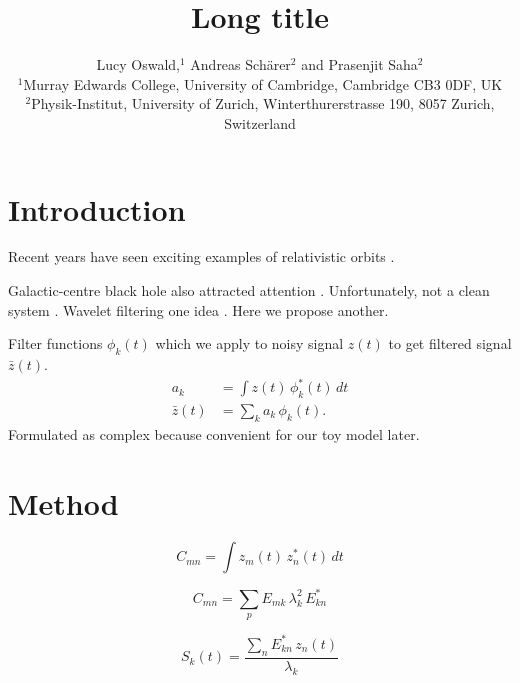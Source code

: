 \documentclass[usenatbib]{mnras}
\title[Short title]{Long title}
\author[Oswald et al]{Lucy Oswald,$^1$
Andreas Sch\"arer$^2$ and Prasenjit Saha$^2$\\
%
$^1$Murray Edwards College, University of Cambridge, Cambridge CB3 0DF, UK\\
$^2$Physik-Institut, University of Zurich, Winterthurerstrasse 190, 8057 Zurich, Switzerland\\
}
\begin{document}
\label{firstpage}
\pagerange{\pageref{firstpage}--\pageref{lastpage}}
\maketitle

\begin{abstract}
\end{abstract}

\begin{keywords}
\end{keywords}

\section{Introduction}

Recent years have seen exciting examples of relativistic
orbits \citep{2006Sci...314...97K,2006NewA...11..527C,2011PhRvL.106v1101E}.

Galactic-centre black hole also attracted attention
\citep{2008ApJ...674L..25W,2010ApJ...711..157A,2010ApJ...720.1303A,2015ApJ...809..127Z}.
Unfortunately, not a clean system \citep[cf.][]{1947RvMP...19..361C}.
Wavelet filtering one idea \citep{2014MNRAS.444.3780A}.  Here we
propose another.

Filter functions $\phi_k(t)$ which we apply to noisy signal $z(t)$ to
get filtered signal $\bar z(t)$.
\begin{equation}
\begin{aligned}
        a_k &= \int\! z(t)\,\phi_k^*(t)\,dt \\
  \bar z(t) &= \sum_k a_k \, \phi_k(t) .
\end{aligned}
\end{equation}
Formulated as complex because convenient for our toy model later.

\section{Method}

\citep{chatterjee2000introduction}

\begin{equation}
C_{mn} = \int\! z_m(t)\,z_n^*(t)\,dt
\end{equation}

\begin{equation}
C_{mn} = \sum_p E_{mk} \, \lambda_k^2 \, E_{kn}^*
\end{equation}

\begin{equation}
S_k(t) = \frac{\sum_n E_{kn}^*\,z_n(t)}{\lambda_k}
\end{equation}
\end{document}
